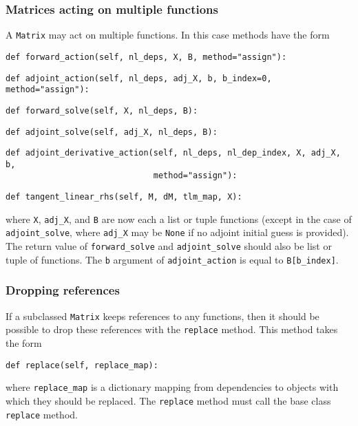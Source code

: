 \documentclass[11pt]{article}
\begin{document}
\subsubsection{Matrices acting on multiple functions}\label{sect:Matrix_multiple}

A \texttt{Matrix} may act on multiple functions. In this case methods have the
form
\begin{lstlisting}
def forward_action(self, nl_deps, X, B, method="assign"):
\end{lstlisting}
\begin{lstlisting}
def adjoint_action(self, nl_deps, adj_X, b, b_index=0, method="assign"):
\end{lstlisting}
\begin{lstlisting}
def forward_solve(self, X, nl_deps, B):
\end{lstlisting}
\begin{lstlisting}
def adjoint_solve(self, adj_X, nl_deps, B):
\end{lstlisting}
\begin{lstlisting}
def adjoint_derivative_action(self, nl_deps, nl_dep_index, X, adj_X, b,
                              method="assign"):
\end{lstlisting}
\begin{lstlisting}
def tangent_linear_rhs(self, M, dM, tlm_map, X):
\end{lstlisting}
where \texttt{X}, \texttt{adj\_X}, and \texttt{B} are now each a list or tuple
functions (except in the case of \texttt{adjoint\_solve}, where \texttt{adj\_X}
may be \texttt{None} if no adjoint initial guess is provided). The return value
of \texttt{forward\_solve} and \texttt{adjoint\_solve} should also be list or
tuple of functions. The \texttt{b} argument of \texttt{adjoint\_action} is
equal to \texttt{B[b\_index]}.

\subsubsection{Dropping references}

If a subclassed \texttt{Matrix} keeps references to any functions, then it
should be possible to drop these references with the \texttt{replace} method.
This method takes the form
\begin{lstlisting}
def replace(self, replace_map):
\end{lstlisting}
where \texttt{replace\_map} is a dictionary mapping from dependencies to
objects with which they should be replaced. The \texttt{replace} method must
call the base class \texttt{replace} method.
\end{document}
